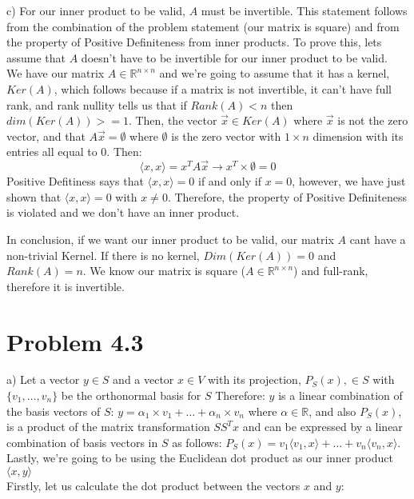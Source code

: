 \documentclass[12pt,twoside]{article}
\begin{document}
\break

c) For our inner product to be valid, $A$ must be invertible. This statement follows from the combination of the problem statement (our matrix is square) and from the property of Positive Definiteness from inner products. To prove this, lets assume that $A$ doesn't have to be invertible for our inner product to be valid. 
\\

We have our matrix $A \in \mathbb{R}^{n\times n}$ and we're going to assume that it has a kernel, $Ker(A)$, which follows because if a matrix is not invertible, it can't have full rank, and rank nullity tells us that if $Rank(A) < n$ then $dim(Ker(A)) >= 1$. Then, the vector $\vec{x} \in Ker(A)$ where $\vec{x}$ is not the zero vector, and that $A\vec{x} = \emptyset$  where $\emptyset$ is the zero vector with $1\times n$ dimension with its entries all equal to 0. Then:
$$
    \langle x,x \rangle = x^TA\vec{x} \rightarrow x^T\times \emptyset = 0 
$$
Positive Defitiness says that $\langle x,x \rangle = 0$ if and only if $x=0$, however, we have just shown that $\langle x,x \rangle = 0$ with $x \neq 0$. Therefore, the property of Positive Definiteness is violated and we don't have an inner product.

In conclusion, if we want our inner product to be valid, our matrix $A$ cant have a non-trivial Kernel. If there is no kernel, $Dim(Ker(A)) = 0$ and $Rank(A) = n$. We know our matrix is square ($A \in \mathbb{R}^{n\times n}$) and full-rank, therefore it is invertible.


\section{Problem 4.3}

a) Let a vector $y\in S$ and a vector $x \in V$ with its projection, $P_S(x), \in S$ with $\{v_1,\dots,v_n\}$ be the orthonormal basis for $S$ Therefore: $y$ is a linear combination of the basis vectors of $S$: $y = \alpha_1 \times v_1 + \dots + \alpha_n \times v_n$ where $\alpha \in \mathbb{R}$, and also $P_S(x)$, is a product of the matrix transformation $SS^Tx$ and can be expressed by a linear combination of basis vectors in $S$ as follows: $P_S(x) = v_1\langle v_1,x\rangle + \dots + v_n \langle v_n, x \rangle$. Lastly, we're going to be using the Euclidean dot product as our inner product $\langle x,y \rangle$ \\

Firstly, let us calculate the dot product between the vectors $x$ and $y$:
\end{document}
